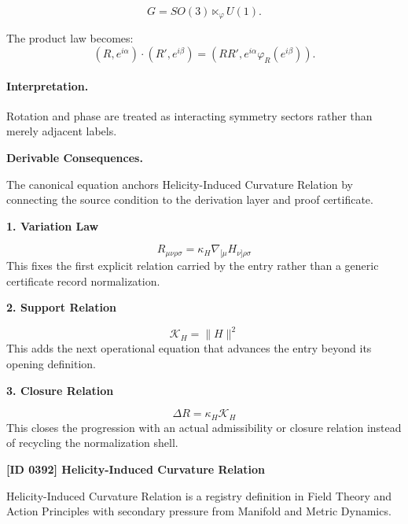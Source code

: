 \begin{equation}
G=SO(3)\ltimes_{\varphi}U(1).
\end{equation}

The product law becomes:
\begin{equation}
\boxed{
(R,e^{i\alpha})\cdot(R',e^{i\beta})
=
\left(
RR',
e^{i\alpha}\varphi_R(e^{i\beta})
\right).
}
\end{equation}

\paragraph{Interpretation.}
Rotation and phase are treated as interacting symmetry sectors rather than merely adjacent labels.

\par\vspace{0.35em}
\noindent\textbf{Derivable Consequences.}\quad
\begingroup
\footnotesize
\raggedright
The canonical equation anchors Helicity-Induced Curvature Relation by connecting the source condition to the derivation layer and proof certificate.
\par\endgroup

\noindent\textbf{1. Variation Law}\par
\[
R_{\mu\nu\rho\sigma}=\kappa_{H}\nabla_{[\mu}H_{\nu]\rho\sigma}
\]
\noindent This fixes the first explicit relation carried by the entry rather than a generic certificate record normalization.\par
\noindent\textbf{2. Support Relation}\par
\[
\mathcal{K}_{H}=\lVert H\rVert^{2}
\]
\noindent This adds the next operational equation that advances the entry beyond its opening definition.\par
\noindent\textbf{3. Closure Relation}\par
\[
\Delta R=\kappa_{H}\mathcal{K}_{H}
\]
\noindent This closes the progression with an actual admissibility or closure relation instead of recycling the normalization shell.\par

\clearpage
\noindent\textbf{[ID 0392] Helicity-Induced Curvature Relation}\par
\vspace{0.35em}
\begingroup\small
{}
Helicity-Induced Curvature Relation is a registry definition in Field Theory and Action Principles with secondary pressure from Manifold and Metric Dynamics.

